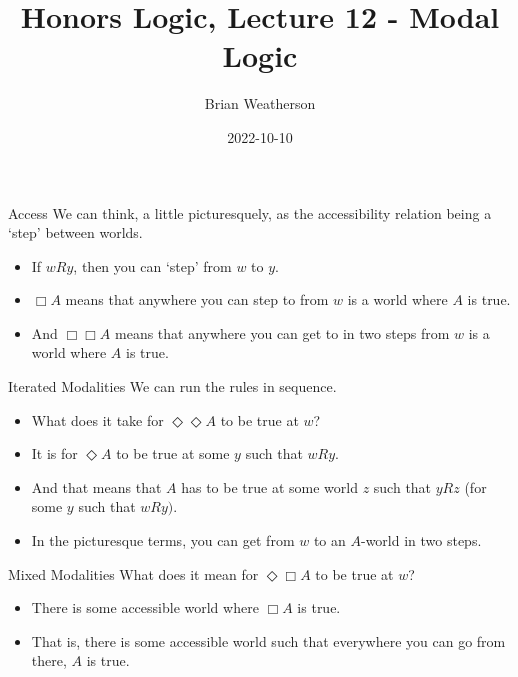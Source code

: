 \documentclass[
  14pt,
  letterpaper,
  ignorenonframetext,
  aspectratio=169,
  handout]{beamer}
\title{Honors Logic, Lecture 12 - Modal Logic}
\author{Brian Weatherson}
\date{2022-10-10}
\providecommand{\tightlist}{%
  \setlength{\itemsep}{0pt}\setlength{\parskip}{0pt}}\usepackage{longtable,booktabs,array}
\begin{document}
\frame{\titlepage}
\ifdefined\Shaded\renewenvironment{Shaded}{\begin{tcolorbox}[boxrule=0pt, interior hidden, sharp corners, enhanced, breakable, borderline west={3pt}{0pt}{shadecolor}, frame hidden]}{\end{tcolorbox}}\fi

\begin{frame}{Access}
\protect\hypertarget{access}{}
We can think, a little picturesquely, as the accessibility relation
being a `step' between worlds.

\begin{itemize}[<+->]
\tightlist
\item
  If \(wRy\), then you can `step' from \(w\) to \(y\).
\item
  \(\Box A\) means that anywhere you can step to from \(w\) is a world
  where \(A\) is true.
\item
  And \(\Box \Box A\) means that anywhere you can get to in two steps
  from \(w\) is a world where \(A\) is true.
\end{itemize}
\end{frame}

\begin{frame}{Iterated Modalities}
\protect\hypertarget{iterated-modalities}{}
We can run the rules in sequence.

\begin{itemize}[<+->]
\tightlist
\item
  What does it take for \(\Diamond \Diamond A\) to be true at \(w\)?
\item
  It is for \(\Diamond A\) to be true at some \(y\) such that \(wRy\).
\item
  And that means that \(A\) has to be true at some world \(z\) such that
  \(yRz\) (for some \(y\) such that \(wRy)\).
\item
  In the picturesque terms, you can get from \(w\) to an \(A\)-world in
  two steps.
\end{itemize}
\end{frame}

\begin{frame}{Mixed Modalities}
\protect\hypertarget{mixed-modalities}{}
What does it mean for \(\Diamond \Box A\) to be true at \(w\)?

\begin{itemize}[<+->]
\tightlist
\item
  There is some accessible world where \(\Box A\) is true.
\item
  That is, there is some accessible world such that everywhere you can
  go from there, \(A\) is true.
\end{itemize}
\end{frame}
\end{document}

